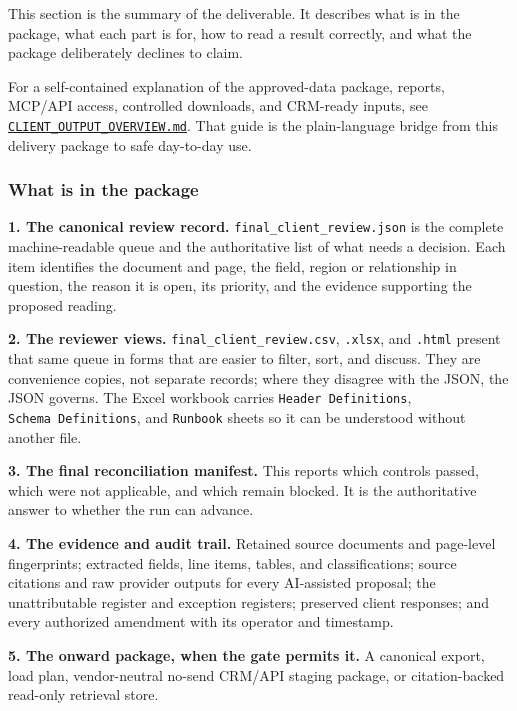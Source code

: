 \documentclass[
]{article}
\begin{document}
This section is the summary of the deliverable. It describes what is in
the package, what each part is for, how to read a result correctly, and
what the package deliberately declines to claim.

For a self-contained explanation of the approved-data package, reports,
MCP/API access, controlled downloads, and CRM-ready inputs, see
\href{CLIENT_OUTPUT_OVERVIEW.md}{\texttt{CLIENT\_\allowbreak{}OUTPUT\_\allowbreak{}OVERVIEW.md}}.
That guide is the plain-language bridge from this delivery package to
safe day-to-day use.

\subsubsection{What is in the package}\label{what-is-in-the-package}

\textbf{1. The canonical review record.}
\texttt{final\_\allowbreak{}client\_\allowbreak{}review.json} is the
complete machine-readable queue and the authoritative list of what needs
a decision. Each item identifies the document and page, the field,
region or relationship in question, the reason it is open, its priority,
and the evidence supporting the proposed reading.

\textbf{2. The reviewer views.}
\texttt{final\_\allowbreak{}client\_\allowbreak{}review.csv},
\texttt{.xlsx}, and \texttt{.html} present that same queue in forms that
are easier to filter, sort, and discuss. They are convenience copies,
not separate records; where they disagree with the JSON, the JSON
governs. The Excel workbook carries \texttt{Header\ Definitions},
\texttt{Schema\ Definitions}, and \texttt{Runbook} sheets so it can be
understood without another file.

\textbf{3. The final reconciliation manifest.} This reports which
controls passed, which were not applicable, and which remain blocked. It
is the authoritative answer to whether the run can advance.

\textbf{4. The evidence and audit trail.} Retained source documents and
page-level fingerprints; extracted fields, line items, tables, and
classifications; source citations and raw provider outputs for every
AI-assisted proposal; the unattributable register and exception
registers; preserved client responses; and every authorized amendment
with its operator and timestamp.

\textbf{5. The onward package, when the gate permits it.} A canonical
export, load plan, vendor-neutral no-send CRM/API staging package, or
citation-backed read-only retrieval store.
\end{document}
